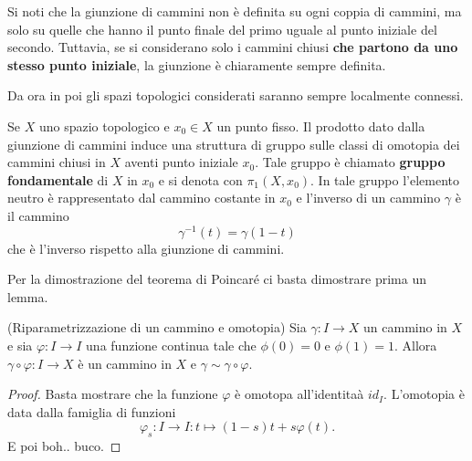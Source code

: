 \documentclass[]{article}
\begin{document}
    \begin{remark} \nl
        Si noti che la giunzione di cammini non è definita su ogni coppia di cammini, ma solo su quelle che hanno
        il punto finale del primo uguale al punto iniziale del secondo. Tuttavia, se si considerano solo i cammini chiusi \textbf{che partono da uno stesso punto iniziale},
        la giunzione è chiaramente sempre definita.
    \end{remark}

    Da ora in poi gli spazi topologici considerati saranno sempre localmente connessi.

    \begin{theorem} [Poincar\'e] \nl
        Se $X$ uno spazio topologico e $x_0 \in X$ un punto fisso. \nl
        Il prodotto dato dalla giunzione di cammini induce una struttura di gruppo sulle classi di omotopia
        dei cammini chiusi in $X$ aventi punto iniziale $x_0$. \nl
        Tale gruppo è chiamato \textbf{gruppo fondamentale} di $X$ in $x_0$ e si denota con $\pi_1(X,x_0)$. \nl
        In tale gruppo l'elemento neutro è rappresentato dal cammino costante in $x_0$ e l'inverso di un cammino $\gamma$ è il cammino
        \[
            \gamma^{-1}(t) = \gamma(1-t)
        \]
        che è l'inverso rispetto alla giunzione di cammini.
    \end{theorem}

    Per la dimostrazione del teorema di Poincar\'e ci basta dimostrare prima un lemma.

    \begin{lemma} (Riparametrizzazione di un cammino e omotopia) \nl
        Sia $\gamma: I \to X$ un cammino in $X$ e sia $\varphi: I \to I$ una funzione continua tale che $\phi(0) = 0$ e $\phi(1) = 1$.
        Allora $\gamma \circ \varphi: I \to X$ è un cammino in $X$ e $\gamma \sim \gamma \circ \varphi$.
    \end{lemma}

    \begin{proof}
        Basta mostrare che la funzione $\varphi$ \`e omotopa all'identita\`a $id_I$. \nl
        L'omotopia \`e data dalla famiglia di funzioni
        \[
            \varphi_s: I \to I: t \mapsto (1-s) t + s \varphi(t).
        \]
        E poi boh.. buco.
    \end{proof}
\end{document}
